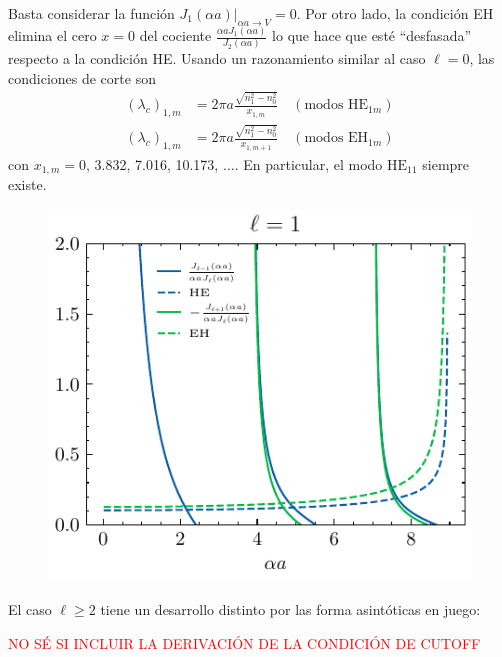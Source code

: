 Basta considerar la función $J_1(\alpha a)|_{\alpha a \to V} = 0$. Por otro lado, la condición EH elimina el cero $x=0$ del cociente $\frac{\alpha aJ_1(\alpha a)}{J_2(\alpha a)}$ lo que hace que esté ``desfasada'' respecto a la condición HE. Usando un razonamiento similar al caso $\ell =0$, las condiciones de corte son
\begin{align*}
	(\lambda_c)_{1,m} &= 2\pi a \frac{\sqrt{n_1^2 - n_0^2}}{x_{1,m}} \quad \left(\text{modos HE}_{1m}\right)
	\\
	(\lambda_c)_{1,m} &= 2\pi a \frac{\sqrt{n_1^2 - n_0^2}}{x_{1,m+1}} \quad \left(\text{modos EH}_{1m}\right)
\end{align*}
con $x_{1,m}=0$, 3.832,  7.016, 10.173, $\dots$.
En particular, el modo $\text{HE}_{11}$ siempre existe.
\begin{figure}[H]
	\centering	\includegraphics[width=0.6\linewidth]{media/fibergraphicalHE_EH.pdf}
\end{figure}

El caso $\ell \ge 2$ tiene un desarrollo distinto por las forma asintóticas en juego:

\textcolor{red}{NO SÉ SI INCLUIR LA DERIVACIÓN DE LA CONDICIÓN DE CUTOFF}

